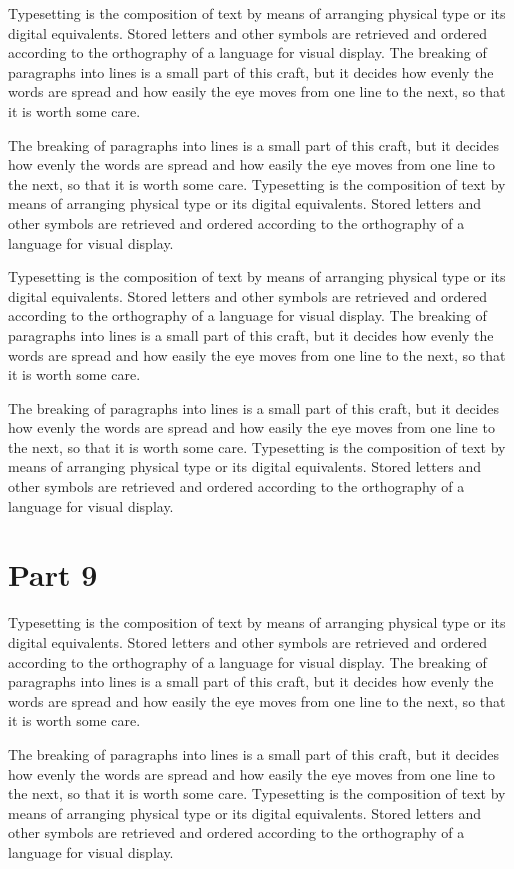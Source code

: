 \documentclass[parskip=half]{scrartcl}
\begin{document}
Typesetting is the composition of text by means of arranging physical type or its digital equivalents. Stored letters and other symbols are retrieved and ordered according to the orthography of a language for visual display. The breaking of paragraphs into lines is a small part of this craft, but it decides how evenly the words are spread and how easily the eye moves from one line to the next, so that it is worth some care.

The breaking of paragraphs into lines is a small part of this craft, but it decides how evenly the words are spread and how easily the eye moves from one line to the next, so that it is worth some care. Typesetting is the composition of text by means of arranging physical type or its digital equivalents. Stored letters and other symbols are retrieved and ordered according to the orthography of a language for visual display.

Typesetting is the composition of text by means of arranging physical type or its digital equivalents. Stored letters and other symbols are retrieved and ordered according to the orthography of a language for visual display. The breaking of paragraphs into lines is a small part of this craft, but it decides how evenly the words are spread and how easily the eye moves from one line to the next, so that it is worth some care.

The breaking of paragraphs into lines is a small part of this craft, but it decides how evenly the words are spread and how easily the eye moves from one line to the next, so that it is worth some care. Typesetting is the composition of text by means of arranging physical type or its digital equivalents. Stored letters and other symbols are retrieved and ordered according to the orthography of a language for visual display.

\section{Part 9}
Typesetting is the composition of text by means of arranging physical type or its digital equivalents. Stored letters and other symbols are retrieved and ordered according to the orthography of a language for visual display. The breaking of paragraphs into lines is a small part of this craft, but it decides how evenly the words are spread and how easily the eye moves from one line to the next, so that it is worth some care.

The breaking of paragraphs into lines is a small part of this craft, but it decides how evenly the words are spread and how easily the eye moves from one line to the next, so that it is worth some care. Typesetting is the composition of text by means of arranging physical type or its digital equivalents. Stored letters and other symbols are retrieved and ordered according to the orthography of a language for visual display.
\end{document}
